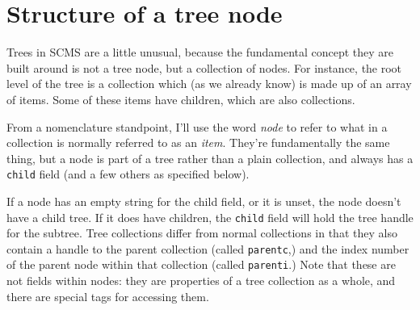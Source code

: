 \section{Structure of a tree node}
Trees in SCMS are a little unusual, because the fundamental concept they are
built around is not a tree node, but a collection of nodes. For instance, the
root level of the tree is a collection which (as we already know) is made up
of an array of items. Some of these items have children, which are also
collections.

From a nomenclature standpoint, I'll use the word \emph{node} to refer to what
in a collection is normally referred to as an \emph{item}. They're
fundamentally the same thing, but a node is part of a tree rather than a plain
collection, and always has a \texttt{child} field (and a few others as
specified below).

If a node has an empty string for the child field, or it is unset, the node
doesn't have a child tree. If it does have children, the \texttt{child} field
will hold the tree handle for the subtree. Tree collections differ from normal
collections in that they also contain a handle to the parent collection
(called \texttt{parentc},) and the index number of the parent node within that
collection (called \texttt{parenti}.) Note that these are not fields within
nodes: they are properties of a tree collection as a whole, and there are
special tags for accessing them.

